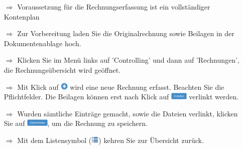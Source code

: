\documentclass{article}
\begin{document}
\begin{multicols}{2}
\begin{tcolorbox}[colback=blue!5,colframe=blue!40!black,title=Eine Rechnung erfassen]
\begin{itemize}
  \item[$\Longrightarrow$] Voraussetzung für die Rechnungserfassung ist ein vollständiger Kontenplan
	\item[$\Longrightarrow$] Zur Vorbereitung laden Sie die Originalrechnung sowie Beilagen in der Dokumentenablage hoch.
  \item[$\Longrightarrow$] Klicken Sie im Menü links auf 'Controlling' und dann auf 'Rechnungen', die Rechnungsübersicht wird geöffnet.
  \item[$\Longrightarrow$] Mit Klick auf \includegraphics[height=10pt]{Icons/Plussymbol.png} wird eine neue Rechnung erfasst. Beachten Sie die Pflichtfelder. Die Beilagen können erst nach Klick auf \includegraphics[height=10pt]{Icons/B_Erstellen.jpg} verlinkt werden.
  \item[$\Longrightarrow$] Wurden sämtliche Einträge gemacht, sowie die Dateien verlinkt, klicken Sie auf \includegraphics[height=10pt]{Icons/B_Uebernehmen.jpg}, um die Rechnung  zu speichern.
	\item[$\Longrightarrow$] Mit dem Listensymbol (\includegraphics[height=10pt]{Icons/Listensymbol_zurueck.png}) kehren Sie zur Übersicht zurück.
\end{itemize}
\end{tcolorbox}


\end{multicols}

\end{document}
